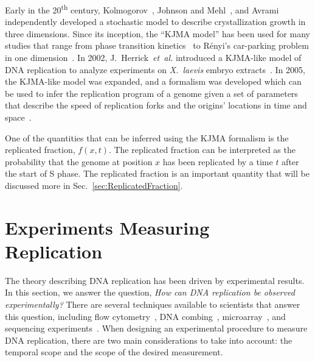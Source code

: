	Early in the 20\textsuperscript{th} century, Kolmogorov~\cite{Kolmogorov}, Johnson and Mehl~\cite{JohnsonAndMehl}, and Avrami~\cite{AvramiI,AvramiII,AvramiIII} independently developed a stochastic model to describe crystallization growth in three dimensions.
	Since its inception, the ``KJMA model'' has been used for many studies that range from phase transition kinetics~\cite{AlloyPhaseTransitions} to R{\'e}nyi's car-parking problem in one dimension~\cite{CarParking}.
	In 2002, J.~Herrick~\emph{et~al.} introduced a KJMA-like model of DNA replication to analyze experiments on \emph{X.~laevis} embryo extracts~\cite{KJMA2002}.
	In 2005, the KJMA-like model was expanded, and a formalism was developed which can be used to infer the replication program of a genome given a set of parameters that describe the speed of replication forks and the origins' locations in time and space~\cite{KJMA1, KJMA2}.
	
	One of the quantities that can be inferred using the KJMA formalism is the replicated fraction, $f(x,t)$.
	The replicated fraction can be interpreted as the probability that the genome at position $x$ has been replicated by a time $t$ after the start of S phase.
	The replicated fraction is an important quantity that will be discussed more in Sec.~\ref{sec:ReplicatedFraction}.
	
	
	\section{Experiments Measuring Replication}
	\label{sec:ExperimentsBasics}
	
	The theory describing DNA replication has been driven by experimental results.
	In this section, we answer the question, \emph{How can DNA replication be observed experimentally?}
	There are several techniques available to scientists that answer this question, including flow cytometry~\cite{DeepSeq}, DNA combing~\cite{DNACombing}, microarray~\cite{MicroarrayReview, McCuneMicroArray}, and sequencing experiments~\cite{StochasticTermination,DeepSeq}.
	When designing an experimental procedure to measure DNA replication, there are two main considerations to take into account: the temporal scope and the scope of the desired measurement.
	
